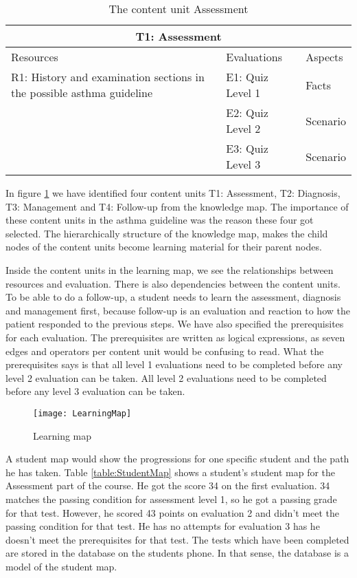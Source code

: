 \begin{table}[h!]
	\caption{The content unit Assessment}
	\label{table:ContentUnit}
\begin{tabular}{ | m{16em} | m{10em}| m{6em} | } 
	\hline
	\multicolumn{3}{c}{\bfseries T1: Assessment} \\
	\hline
	Resources & Evaluations & Aspects \\
	\hline
	R1: History and examination sections in the possible asthma guideline \parencite{RepublicofKeny2016} & E1: Quiz Level 1 & Facts \\
	& E2: Quiz Level 2 & Scenario \\
	& E3: Quiz Level 3 & Scenario \\
	\hline
	\end{tabular}
\end{table}

In figure \ref{fig:LearningMap} we have identified four content units T1: Assessment, T2: Diagnosis, T3: Management and T4: Follow-up from the knowledge map. The importance of these content units in the asthma guideline \parencite{RepublicofKeny2016} was the reason these four got selected. The hierarchically structure of the knowledge map, makes the child nodes of the content units become learning material for their parent nodes.

Inside the content units in the learning map, we see the relationships between resources and evaluation. There is also dependencies between the content units. To be able to do a follow-up, a student needs to learn the assessment, diagnosis and management first, because follow-up is an evaluation and reaction to how the patient responded to the previous steps.  We have also specified the prerequisites for each evaluation. The prerequisites are written as logical expressions, as seven edges and operators per content unit would be confusing to read. What the prerequisites says is that all level 1 evaluations need to be completed before any level 2 evaluation can be taken. All level 2 evaluations need to be completed before any level 3 evaluation can be taken.

\begin{figure}[h!]
	\caption {Learning map}
	\label{fig:LearningMap}
	\texttt{[image: LearningMap]}
\end{figure}

A student map would show the progressions for one specific student and the path he has taken. Table \ref{table:StudentMap} shows a student's student map for the Assessment part of the course. He got the score 34 on the first evaluation. 34 matches the passing condition for assessment level 1, so he got a passing grade for that test. However, he scored 43 points on evaluation 2 and didn't meet the passing condition for that test. He has no attempts for evaluation 3 has he doesn't meet the prerequisites for that test.  The tests which have been completed are stored in the database on the students phone. In that sense, the database is a model of the student map.

